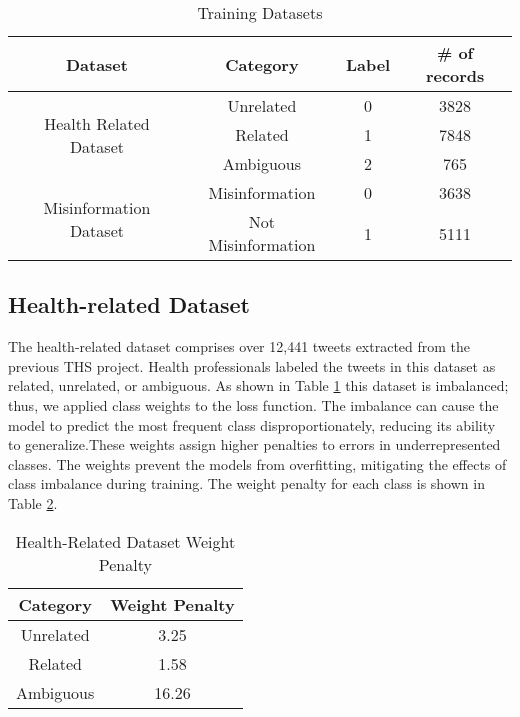 \begin{table}[H]
	\centering
	\caption{Training Datasets}
	\begin{tabular}{||c | c | c| c||} 
		\hline
		\textbf{Dataset} &
		\textbf{Category} & \textbf{Label}& \textbf{\# of records} \\ [1.5ex] 
		\hline
		\multirow{3}{6.75em}{Health Related Dataset} & Unrelated & 0 & 3828  \\[1ex]
		& Related & 1 & 7848  \\ [1ex]
		& Ambiguous & 2 & 765 \\[1ex]
		\hline
		\multirow{2}{6.75em}{Misinformation Dataset} & Misinformation & 0 & 3638\\ [1ex]
		& Not Misinformation & 1 & 5111  \\[1ex]
		\hline
	\end{tabular}
	\label{table:dataset}
\end{table}


\subsection{Health-related Dataset}
The health-related dataset comprises over 12,441 tweets extracted from the previous THS project.  Health professionals labeled the tweets in this dataset as related, unrelated, or ambiguous. As shown in Table \ref{table:dataset} this dataset is imbalanced; thus, we applied class weights to the loss function. The imbalance can cause the model to predict the most frequent class disproportionately, reducing its ability to generalize.These weights assign higher penalties to errors in underrepresented classes. The weights prevent the models from overfitting, mitigating the effects of class imbalance during training. The weight penalty for each class is shown in Table \ref{table:healthweight}.

\begin{table}[H]
	\centering
	\caption{Health-Related Dataset Weight Penalty}
	\begin{tabular}{||c | c||} 
			\hline
			\textbf{Category} & \textbf{Weight Penalty} \\ [1.5ex] 
			\hline
			Unrelated & 3.25 \\ [1ex]
			\hline
			Related & 1.58 \\[1ex]
			\hline
			Ambiguous & 16.26 \\[1ex]
			\hline
		\end{tabular}
	\label{table:healthweight}
\end{table}


